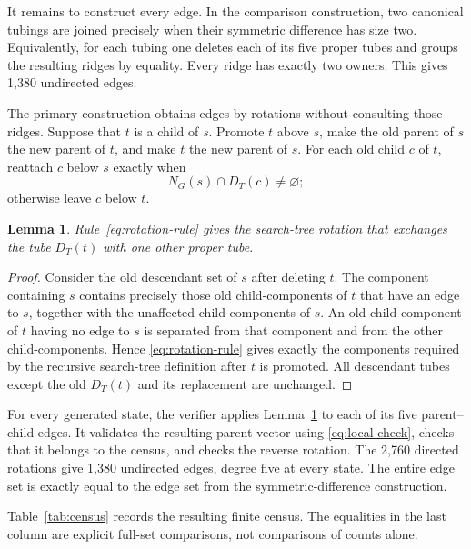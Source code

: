 \documentclass[11pt]{article}
\newtheorem{lemma}[theorem]{Lemma}
\begin{document}
It remains to construct every edge.  In the comparison construction, two
canonical tubings are joined precisely when their symmetric difference has
size two.  Equivalently, for each tubing one deletes each of its five proper
tubes and groups the resulting ridges by equality.  Every ridge has exactly
two owners.  This gives 1,380 undirected edges.

The primary construction obtains edges by rotations without consulting those
ridges.  Suppose that \(t\) is a child of \(s\).  Promote \(t\) above \(s\),
make the old parent of \(s\) the new parent of \(t\), and make \(t\) the new
parent of \(s\).  For each old child \(c\) of \(t\), reattach \(c\) below
\(s\) exactly when
\begin{equation}\label{eq:rotation-rule}
  N_G(s)\cap D_T(c)\neq\varnothing;
\end{equation}
otherwise leave \(c\) below \(t\).

\begin{lemma}\label{lem:rotation}
Rule~\eqref{eq:rotation-rule} gives the search-tree rotation that exchanges the
tube \(D_T(t)\) with one other proper tube.
\end{lemma}

\begin{proof}
Consider the old descendant set of \(s\) after deleting \(t\).  The component
containing \(s\) contains precisely those old child-components of \(t\) that
have an edge to \(s\), together with the unaffected child-components of
\(s\).  An old child-component of \(t\) having no edge to \(s\) is separated
from that component and from the other child-components.  Hence
\eqref{eq:rotation-rule} gives exactly the components required by the recursive
search-tree definition after \(t\) is promoted.  All descendant tubes except
the old \(D_T(t)\) and its replacement are unchanged.
\end{proof}

For every generated state, the verifier applies Lemma~\ref{lem:rotation} to
each of its five parent--child edges.  It validates the resulting parent vector
using \eqref{eq:local-check}, checks that it belongs to the census, and checks
the reverse rotation.  The 2,760 directed rotations give 1,380 undirected
edges, degree five at every state.  The entire edge set is exactly equal to the
edge set from the symmetric-difference construction.

Table~\ref{tab:census} records the resulting finite census.  The equalities in
the last column are explicit full-set comparisons, not comparisons of counts
alone.
\end{document}
